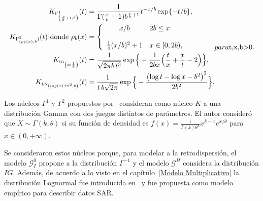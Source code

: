 \begin{subequations}
	\label{NucleosAsimetricosUsados}
	\begin{align}
	K_{\tiny \Gamma^1_{\left(\frac{x}{b}+1,b\right)}}(t) & =\frac{1}{\Gamma(\frac{x}{b}+1)b^{\frac{x}{b}+1}} t^{-{x}/{b}} \exp\{-{t}/{b}\},
	\label{gammakernel}\\
	K_{\tiny \Gamma^2_{({\rho}_b(x),b})}(t) \text{ donde }
	\rho_b (x)&= \left\{
	\begin{array}{c l}
	x/b & 2 b \leq  x \\
	\\
	\frac{1}{4}(x/b)^2+1 & x \in [0,2 b),\\
	\end{array}
	\right.
	\label{gammakernel2}\\
	K_{\text{\tiny IG}_{\left( x;\frac{1}{b}\right)}}(t) & =\frac{1}{\sqrt{2\pi b \, t^3}} 
	\exp\Big\{-\frac{1}{2b x} \Big(\frac{t}{x}+\frac{x}{t}-2\Big)\Big\},
	\label{IGkernel}\\
	K_{{\text{\tiny LN}}_{\left(log(x)+b^2,b \right)}}(t) & =\frac{1}{t\,b \sqrt{2 \pi}} \exp\Big\{-\frac{\left(\log t - \log x -b^2\right)^2}{2b^2}\Big\},
	\label{LNkernel}
	\end{align}
	para $t,x,b>0$.
\end{subequations}

Los núcleos $\Gamma^1$ y $\Gamma^2$ propuestos por~\citet{chensx2000} consideran como núcleo $K$ a una distribución Gamma con dos juegos distintos de parámetros. El autor consideró que $X \sim \Gamma(k,\theta)$ si su función de densidad es $f(x)=\frac{1}{\Gamma(k) \theta^k} x^{k-1} e^{x/\theta}$ para $x \in (0,+\infty)$. 

Se consideraron estos núcleos porque, para modelar a la retrodispersión, el modelo $\mathcal{G}_I^0$ propone a la distribución $\Gamma^{-1}$ y el modelo $\mathcal{G}^H$ considera la distribución $IG$. Además, de acuerdo a lo visto en el capítulo~\ref{Modelo Multiplicativo} la distribución Lognormal fue introducida en~\citet{oliverquegan98} y fue propuesta como modelo empírico para describir datos SAR.




